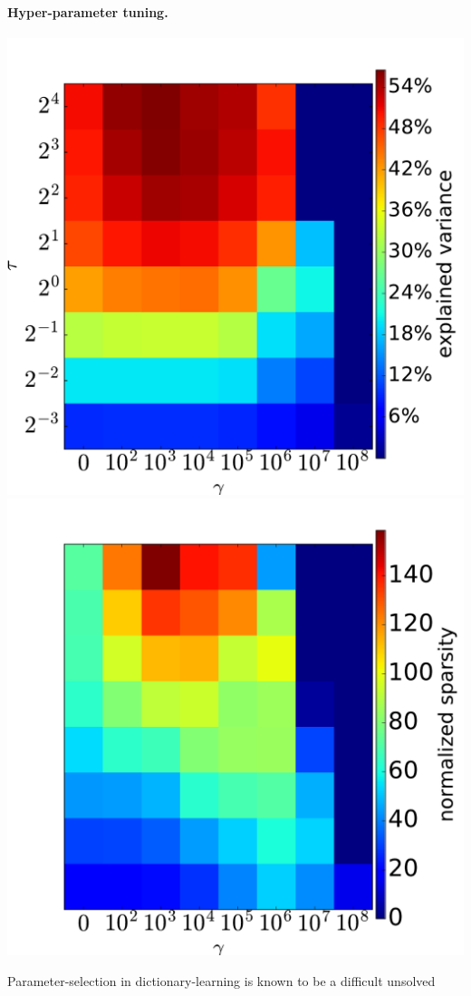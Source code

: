 \paragraph{Hyper-parameter tuning.}
\begin{marginfigure}[4cm]
  \includegraphics[width=.45\linewidth]{figures/heat_LANGUAGE_1.pdf}
  \includegraphics[width=.45\linewidth]{figures/sparsity.pdf}
  \caption{\textbf{Influence of model parameters.} %
In the experiments, $\alpha$ was chosen according to \eqref{eq:varyingalpha}. \textbf{Left:} Percentage explained variance of the decomposition, measured on left-out data split.
    \textbf{Right: }%
    Average normalized sparsity of the dictionary atoms. %
  }
  \label{fig:param}
\end{marginfigure}
Parameter-selection in dictionary-learning is known to be a difficult unsolved
